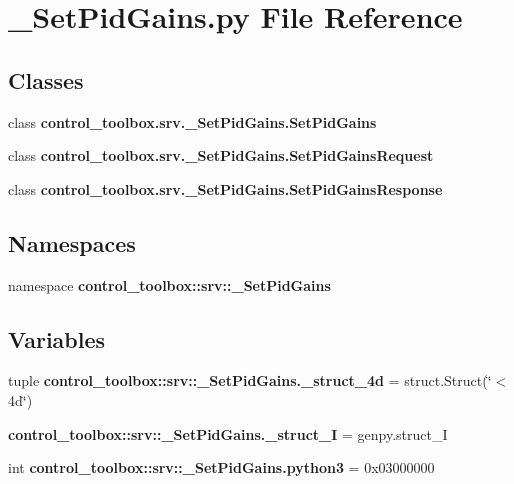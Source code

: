\section{\-\_\-\-Set\-Pid\-Gains.\-py \-File \-Reference}
\label{__SetPidGains_8py}
\subsection*{\-Classes}
\begin{DoxyCompactItemize}
\item 
class {\bf control\-\_\-toolbox.\-srv.\-\_\-\-Set\-Pid\-Gains.\-Set\-Pid\-Gains}
\item 
class {\bf control\-\_\-toolbox.\-srv.\-\_\-\-Set\-Pid\-Gains.\-Set\-Pid\-Gains\-Request}
\item 
class {\bf control\-\_\-toolbox.\-srv.\-\_\-\-Set\-Pid\-Gains.\-Set\-Pid\-Gains\-Response}
\end{DoxyCompactItemize}
\subsection*{\-Namespaces}
\begin{DoxyCompactItemize}
\item 
namespace {\bf control\-\_\-toolbox\-::srv\-::\-\_\-\-Set\-Pid\-Gains}
\end{DoxyCompactItemize}
\subsection*{\-Variables}
\begin{DoxyCompactItemize}
\item 
tuple {\bf control\-\_\-toolbox\-::srv\-::\-\_\-\-Set\-Pid\-Gains.\-\_\-struct\-\_\-4d} = struct.\-Struct(\char`\"{}$<$4d\char`\"{})
\item 
{\bf control\-\_\-toolbox\-::srv\-::\-\_\-\-Set\-Pid\-Gains.\-\_\-struct\-\_\-\-I} = genpy.\-struct\-\_\-\-I
\item 
int {\bf control\-\_\-toolbox\-::srv\-::\-\_\-\-Set\-Pid\-Gains.\-python3} = 0x03000000
\end{DoxyCompactItemize}
